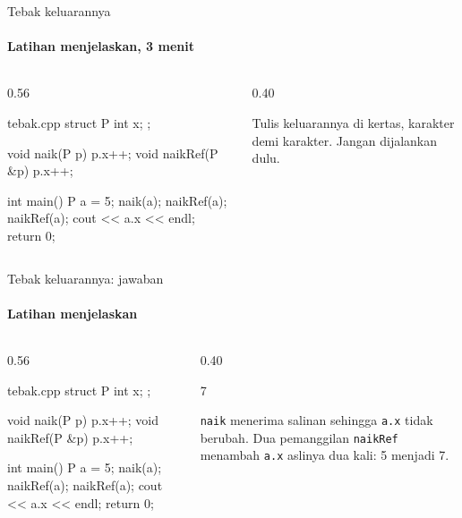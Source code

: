 \documentclass[t]{beamer}
\begin{document}
\begin{frame}[fragile]{Tebak keluarannya}
\framesubtitle{Latihan menjelaskan, 3 menit}
\begin{columns}[T]
\begin{column}{0.56\textwidth}
\begin{Kode}[listing options={style=ITERACodeMini}]{tebak.cpp}
struct P { int x; };

void naik(P p) { p.x++; }
void naikRef(P &p) { p.x++; }

int main() {
    P a = {5};
    naik(a);
    naikRef(a);
    naikRef(a);
    cout << a.x << endl;
    return 0;
}
\end{Kode}
\end{column}
\begin{column}{0.40\textwidth}
\begin{Catatan}
Tulis keluarannya di kertas, karakter demi karakter. Jangan dijalankan dulu.
\end{Catatan}
\end{column}
\end{columns}
\end{frame}

\begin{frame}[fragile]{Tebak keluarannya: jawaban}
\framesubtitle{Latihan menjelaskan}
\begin{columns}[T]
\begin{column}{0.56\textwidth}
\begin{Kode}[listing options={style=ITERACodeMini}]{tebak.cpp}
struct P { int x; };

void naik(P p) { p.x++; }
void naikRef(P &p) { p.x++; }

int main() {
    P a = {5};
    naik(a);
    naikRef(a);
    naikRef(a);
    cout << a.x << endl;
    return 0;
}
\end{Kode}
\end{column}
\begin{column}{0.40\textwidth}
\begin{Keluaran}[]
7
\end{Keluaran}
\begin{Catatan}
\texttt{naik} menerima salinan sehingga \texttt{a.x} tidak berubah. Dua pemanggilan \texttt{naikRef} menambah \texttt{a.x} aslinya dua kali: 5 menjadi 7.
\end{Catatan}
\end{column}
\end{columns}
\end{frame}
\end{document}

